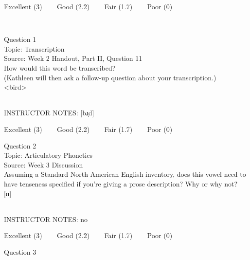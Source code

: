 \documentclass[12pt]{article}
\begin{document}
\vfill
Excellent (3) ~~~ Good (2.2) ~~~ Fair (1.7) ~~~ Poor (0)
\newpage

\begin{center}
\textbf{{\color{red}{\HUGE END OF EXAM}}}\\

\end{center}
\newpage

\begin{center}
\textbf{{\color{blue}{\HUGE START OF EXAM\\}}}

\textbf{{\color{blue}{\HUGE Student ID: 74654\\}}}

\textbf{{\color{blue}{\HUGE \\}}}

\end{center}
\newpage

{\large Question 1}\\

Topic: Transcription\\
Source: Week 2 Handout, Part II, Question 11\\

How would this word be transcribed?\\ (Kathleen will then ask a follow-up question about your transcription.)\\

<bird>


~\\
INSTRUCTOR NOTES: [bɹ̩d]


\vfill
Excellent (3) ~~~ Good (2.2) ~~~ Fair (1.7) ~~~ Poor (0)
\newpage

{\large Question 2}\\

Topic: Articulatory Phonetics\\
Source: Week 3 Discussion\\

Assuming a Standard North American English inventory, does this vowel need to have tenseness specified if you're giving a prose description? Why or why not?\\

{[ɑ]}


~\\
INSTRUCTOR NOTES: no


\vfill
Excellent (3) ~~~ Good (2.2) ~~~ Fair (1.7) ~~~ Poor (0)
\newpage

{\large Question 3}\\
\end{document}
